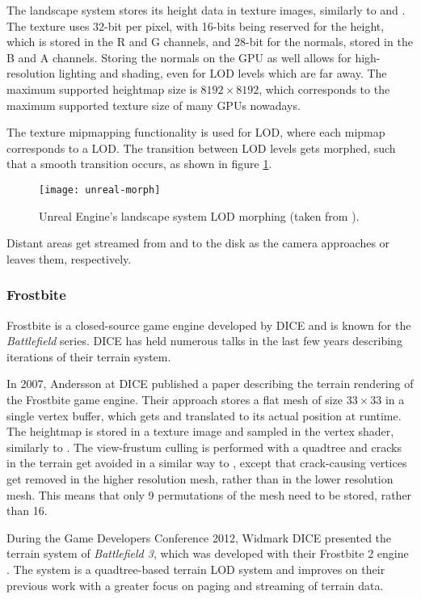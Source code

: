 The landscape system stores its height data in texture images, similarly 
to \cite{gpugeomclipmaps} and \cite{cdlod}. 
The texture uses 32-bit per pixel, with 16-bits 
being reserved for the height, which is stored in the R and G channels,
and 28-bit for the normals, stored in the B and A channels.
Storing the normals on the GPU as well allows for high-resolution 
lighting and shading, even for LOD levels which are far away.
The maximum supported heightmap size is $8192 \times 8192$, which corresponds 
to the maximum supported texture size of many GPUs nowadays.

The texture mipmapping functionality is used for LOD, where each 
mipmap corresponds to a LOD. The transition between LOD levels 
gets morphed, such that a smooth transition occurs, as shown in figure \ref{fig:unreal-morph}.

\begin{figure}[H]
  \centering
  \texttt{[image: unreal-morph]}
  \caption{Unreal Engine's landscape system LOD morphing (taken from \cite{unrealengine5doc}).}\label{fig:unreal-morph}
\end{figure}

Distant areas get streamed from and to the disk as the camera approaches 
or leaves them, respectively. 

\subsubsection{Frostbite}
Frostbite is a closed-source game engine developed by DICE and is known for the \textit{Battlefield} series.
DICE has held numerous talks in the last few years describing iterations of their
terrain system.

In 2007, Andersson at DICE published a paper describing the terrain rendering 
of the Frostbite game engine. Their approach stores a flat mesh of size $33 \times 33$
in a single vertex buffer, which gets and translated to its actual position at runtime.
The heightmap is stored in a texture image and sampled in the vertex shader, similarly to 
\cite{gpugeomclipmaps}. The view-frustum culling is performed with a quadtree 
and cracks in the terrain get avoided in a similar way to \cite{geomipmapping},
except that crack-causing vertices get removed in the higher resolution mesh,
rather than in the lower resolution mesh. This means that only
9 permutations of the mesh need to be stored, rather than 16.

During the Game Developers Conference 2012, Widmark DICE presented the terrain system of \textit{Battlefield 3}, which was developed with their Frostbite 2 engine \cite{bf3}.
The system is a quadtree-based terrain LOD system and improves on their previous work with a greater focus on paging and streaming of terrain data.
